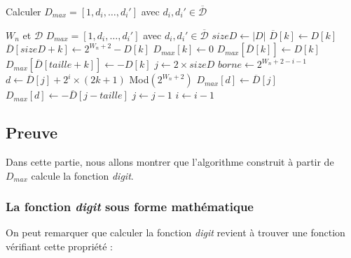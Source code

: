 \documentclass[12pt, a4paper]{memoir}
\begin{document}
 \begin{algorithm}
  \caption{Calculer $D_{max} = [1,d_i,\ldots,d_i']$ avec $d_i,d_i' \in \overline{\mathcal{D}}$}
  \begin{algorithmic}
   \REQUIRE $W_n$ et $\mathcal{D}$
   \ENSURE $D_{max} = [1,d_i,\ldots,d_i']$ avec $d_i,d_i' \in \overline{\mathcal{D}}$
   \STATE $sizeD \leftarrow |D|$
   \STATE $\overline{D}[k] \leftarrow D[k]$
   \STATE $\overline{D}[sizeD+k] \leftarrow 2^{W_n+2}-D[k]$
   \ENDFOR
   \STATE $D_{max}[k] \leftarrow 0$
   \ENDFOR
   \STATE $D_{max}[\overline{D}[k]] \leftarrow D[k]$
   \STATE $D_{max}[\overline{D}[taille+k]] \leftarrow -D[k]$
   \ENDFOR
   \STATE $j \leftarrow 2 \times sizeD$
   \STATE $borne \leftarrow 2^{W_n+2-i-1}$
   \STATE $d \leftarrow \overline{D}[j] + 2^{i} \times (2k+1)$ Mod$(2^{W_n+2})$
   \STATE $D_{max}[d] \leftarrow \overline{D}[j]$
   \STATE $D_{max}[d] \leftarrow -\overline{D}[j-taille]$
   \ENDIF
   \ENDIF
   \ENDFOR
   \STATE $j \leftarrow j-1$
   \ENDWHILE   
   \STATE $i \leftarrow i-1$
   \ENDWHILE
  \end{algorithmic}
 \end{algorithm}

\subsection{Preuve}

Dans cette partie, nous allons montrer que l'algorithme construit à partir de \emph{$D_{max}$} calcule la fonction \emph{digit}.

\subsubsection{La fonction \emph{digit} sous forme mathématique}

On peut remarquer que calculer la fonction \emph{digit} revient à trouver une fonction vérifiant cette propriété :
\end{document}
